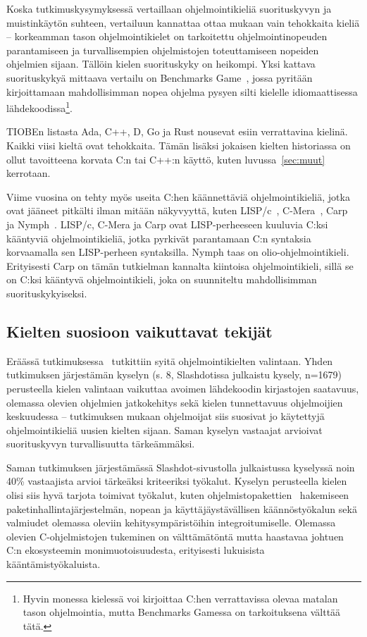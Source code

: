 Koska tutkimuskysymyksessä vertaillaan ohjelmointikieliä suorituskyvyn ja
muistinkäytön suhteen, vertailuun kannattaa ottaa mukaan vain tehokkaita kieliä
-- korkeamman tason ohjelmointikielet on tarkoitettu ohjelmointinopeuden
parantamiseen ja turvallisempien ohjelmistojen toteuttamiseen nopeiden
ohjelmien sijaan. Tällöin kielen suorituskyky on heikompi. Yksi kattava
suorituskykyä mittaava vertailu on Benchmarks Game~\citep{benchmarks}, jossa
pyritään kirjoittamaan mahdollisimman nopea ohjelma pysyen silti kielelle
idiomaattisessa lähdekoodissa\footnote{Hyvin monessa kielessä voi kirjoittaa
C:hen verrattavissa olevaa matalan tason ohjelmointia, mutta Benchmarks Gamessa
on tarkoituksena välttää tätä.}.

TIOBEn listasta Ada, C++, D, Go ja Rust nousevat esiin verrattavina kielinä.
Kaikki viisi kieltä ovat tehokkaita. Tämän lisäksi jokaisen kielten historiassa
on ollut tavoitteena korvata C:n tai C++:n käyttö, kuten luvussa~\ref{sec:muut}
kerrotaan.

Viime vuosina on tehty myös useita C:hen käännettäviä ohjelmointikieliä, jotka
ovat jääneet pitkälti ilman mitään näkyvyyttä, kuten LISP/c~\citep{clisp1},
C-Mera~\citep{clisp2}, Carp~\citep{clisp3} ja Nymph~\citep{nymph}. LISP/c,
C-Mera ja Carp ovat LISP-perheeseen kuuluvia C:ksi kääntyviä ohjelmointikieliä,
jotka pyrkivät parantamaan C:n syntaksia korvaamalla sen LISP-perheen
syntaksilla. Nymph taas on olio-ohjelmointikieli. Erityisesti Carp on tämän
tutkielman kannalta kiintoisa ohjelmointikieli, sillä se on C:ksi kääntyvä
ohjelmointikieli, joka on suunniteltu mahdollisimman suorituskykyiseksi.

\subsection{Kielten suosioon vaikuttavat tekijät}
\label{sec:suosio}

Eräässä tutkimuksessa~\citep{empiricalpopularity} tutkittiin syitä
ohjelmointikielten valintaan. Yhden tutkimuksen järjestämän kyselyn (s. 8,
\mbox{Slashdotissa} julkaistu kysely, n=1679) perusteella kielen valintaan
vaikuttaa avoimen lähdekoodin kirjastojen saatavuus, olemassa olevien ohjelmien
jatkokehitys sekä kielen tunnettavuus ohjelmoijien keskuudessa -- tutkimuksen
mukaan ohjelmoijat siis suosivat jo käytettyjä ohjelmointikieliä uusien kielten
sijaan. Saman kyselyn vastaajat arvioivat suorituskyvyn turvallisuutta
tärkeämmäksi.

Saman tutkimuksen järjestämässä Slashdot-sivustolla julkaistussa kyselyssä noin
40\% vastaajista arvioi tärkeäksi kriteeriksi työkalut. Kyselyn perusteella
kielen olisi siis hyvä tarjota toimivat työkalut, kuten
ohjelmistopakettien~ hakemiseen
paketinhallintajärjestelmän, nopean ja
käyttäjäystävällisen käännöstyökalun sekä valmiudet olemassa oleviin
kehitysympäristöihin integroitumiselle. Olemassa olevien C-ohjelmistojen
tukeminen on välttämätöntä mutta haastavaa johtuen C:n ekosysteemin
monimuotoisuudesta, erityisesti lukuisista kääntämistyökaluista.

